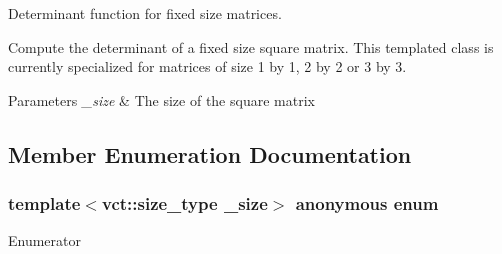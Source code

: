 Determinant function for fixed size matrices. 

Compute the determinant of a fixed size square matrix. This templated class is currently specialized for matrices of size 1 by 1, 2 by 2 or 3 by 3.


\begin{DoxyParams}{Parameters}
{\em \-\_\-size} & The size of the square matrix \\
\hline
\end{DoxyParams}


\subsection{Member Enumeration Documentation}
\hypertarget{classvct_determinant_a0d11bb9b2c0545dde730acad696bb723}{\subsubsection[{anonymous enum}]{\setlength{\rightskip}{0pt plus 5cm}template$<$vct\-::size\-\_\-type \-\_\-size$>$ anonymous enum}}\label{classvct_determinant_a0d11bb9b2c0545dde730acad696bb723}
\begin{Desc}
\item[Enumerator]\par
\begin{description}
\item[{\em 
\hypertarget{classvct_determinant_a0d11bb9b2c0545dde730acad696bb723af5935306ad86f093f0b4b547d12cf2c6}{S\-I\-Z\-E}\label{classvct_determinant_a0d11bb9b2c0545dde730acad696bb723af5935306ad86f093f0b4b547d12cf2c6}
}]\end{description}
\end{Desc}


